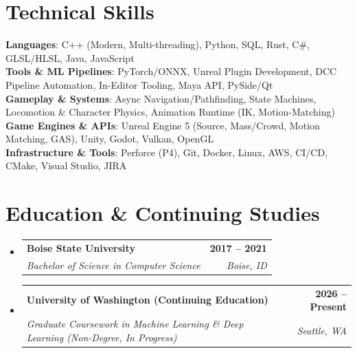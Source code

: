 \documentclass[letterpaper,11pt]{article}
\makeatletter
\newcommand{\resumeSubheading}[4]{
  \vspace{-2pt}\item
    \begin{tabular*}{1.0\textwidth}[t]{l@{\extracolsep{\fill}}r}
      \textbf{#1} & \textbf{\small #2} \\
      \textit{\small#3} & \textit{\small #4} \\
    \end{tabular*}\vspace{-7pt}
}
\newcommand{\resumeSubHeadingListStart}{\begin{itemize}[leftmargin=0.0in, label={}]}
\newcommand{\resumeSubHeadingListEnd}{\end{itemize}}
\makeatother
\begin{document}
\section{Technical Skills}
 \begin{itemize}[leftmargin=0.15in, label={}]
    \small{\item{
     \textbf{Languages}{: C++ (Modern, Multi-threading), Python, SQL, Rust, C\#, GLSL/HLSL, Java, JavaScript} \\
     \textbf{Tools \& ML Pipelines}{: PyTorch/ONNX, Unreal Plugin Development, DCC Pipeline Automation, In-Editor Tooling, Maya API, PySide/Qt} \\
     \textbf{Gameplay \& Systems}{: Async Navigation/Pathfinding, State Machines, Locomotion \& Character Physics, Animation Runtime (IK, Motion-Matching)} \\
     \textbf{Game Engines \& APIs}{: Unreal Engine 5 (Source, Mass/Crowd, Motion Matching, GAS), Unity, Godot, Vulkan, OpenGL} \\
     \textbf{Infrastructure \& Tools}{: Perforce (P4), Git, Docker, Linux, AWS, CI/CD, CMake, Visual Studio, JIRA}
    }}
 \end{itemize}
 \vspace{-12pt}

\section{Education \& Continuing Studies}
  \resumeSubHeadingListStart
    \resumeSubheading
      {Boise State University}{2017 -- 2021}
      {Bachelor of Science in Computer Science}{Boise, ID}
    \resumeSubheading
      {University of Washington (Continuing Education)}{2026 -- Present}
      {Graduate Coursework in Machine Learning \& Deep Learning (Non-Degree, In Progress)}{Seattle, WA}
  \resumeSubHeadingListEnd
\end{document}
